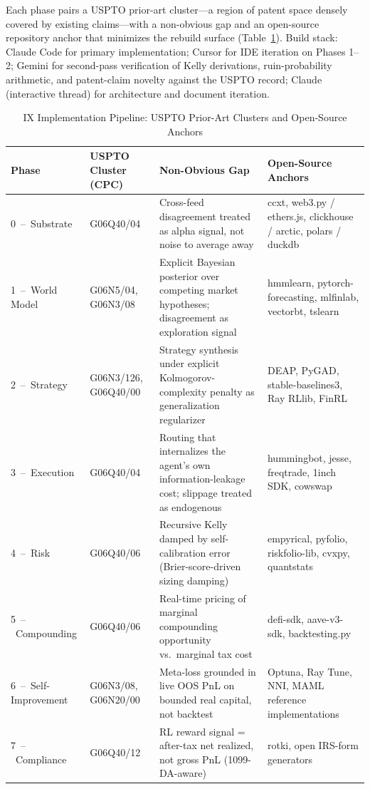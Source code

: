 \documentclass[conference,10pt,letterpaper]{IEEEtran}
\begin{document}
Each phase pairs a USPTO prior-art cluster---a region of patent space
densely covered by existing claims---with a non-obvious gap and an
open-source repository anchor that minimizes the rebuild surface
(Table~\ref{tab:pipeline}). Build stack: Claude Code for primary
implementation; Cursor for IDE iteration on Phases 1--2; Gemini for
second-pass verification of Kelly derivations, ruin-probability arithmetic,
and patent-claim novelty against the USPTO record; Claude (interactive
thread) for architecture and document iteration.

\begin{table}[!t]
\caption{IX Implementation Pipeline: USPTO Prior-Art Clusters and Open-Source Anchors}
\label{tab:pipeline}
\centering
\renewcommand{\arraystretch}{1.2}
\begin{tabularx}{\textwidth}{@{}l l X X@{}}
\toprule
\textbf{Phase} & \textbf{USPTO Cluster (CPC)} & \textbf{Non-Obvious Gap} & \textbf{Open-Source Anchors} \\
\midrule
0~--~Substrate         & G06Q40/04             & Cross-feed disagreement treated as alpha signal, not noise to average away                       & ccxt, web3.py / ethers.js, clickhouse / arctic, polars / duckdb \\
1~--~World Model       & G06N5/04, G06N3/08    & Explicit Bayesian posterior over competing market hypotheses; disagreement as exploration signal & hmmlearn, pytorch-forecasting, mlfinlab, vectorbt, tslearn \\
2~--~Strategy          & G06N3/126, G06Q40/00  & Strategy synthesis under explicit Kolmogorov-complexity penalty as generalization regularizer    & DEAP, PyGAD, stable-baselines3, Ray RLlib, FinRL \\
3~--~Execution         & G06Q40/04             & Routing that internalizes the agent's own information-leakage cost; slippage treated as endogenous & hummingbot, jesse, freqtrade, 1inch SDK, cowswap \\
4~--~Risk              & G06Q40/06             & Recursive Kelly damped by self-calibration error (Brier-score-driven sizing damping)             & empyrical, pyfolio, riskfolio-lib, cvxpy, quantstats \\
5~--~Compounding       & G06Q40/06             & Real-time pricing of marginal compounding opportunity vs.\ marginal tax cost                     & defi-sdk, aave-v3-sdk, backtesting.py \\
6~--~Self-Improvement  & G06N3/08, G06N20/00   & Meta-loss grounded in live OOS PnL on bounded real capital, not backtest                         & Optuna, Ray Tune, NNI, MAML reference implementations \\
7~--~Compliance        & G06Q40/12             & RL reward signal = after-tax net realized, not gross PnL (1099-DA-aware)                         & rotki, open IRS-form generators \\
\bottomrule
\end{tabularx}
\end{table}
\end{document}
